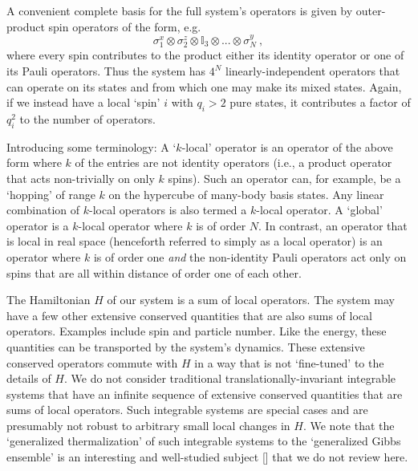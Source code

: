 \documentclass[amsmath,onecolumn, superscriptaddress,preprint,aps]{revtex4}
\renewcommand{\cite}[1]{[\onlinecite{#1}]}
\begin{document}
 A convenient complete basis for the full system's operators is given by outer-product spin operators of the form, e.g.
 \begin{equation}
 \sigma^x_1 \otimes \sigma^z_2 \otimes \mathbb{I}_3 \otimes...\otimes \sigma^y_N~,
 \end{equation}
 where every spin contributes to the product either its identity operator or one of its Pauli operators.
 Thus the system has $4^N$ linearly-independent operators that can operate on its states and from which one may make its mixed states.
 Again, if we instead have a local `spin' $i$ with $q_i>2$ pure states, it contributes a factor of $q_i^2$ to the number of operators.

Introducing some terminology:  A `$k$-local' operator is an operator of the above form where $k$ of the entries are not identity operators
(i.e., a product operator that acts non-trivially on only $k$ spins).  Such an operator can, for example, be a `hopping' of range $k$ on the hypercube of many-body basis states. Any linear combination of $k$-local operators is also termed a $k$-local operator.
A `global' operator is a $k$-local operator where $k$ is of order $N$.  In contrast, an operator that is local in real space
(henceforth referred to simply as a local operator) is an operator where $k$ is of order one {\it and} the non-identity Pauli operators act only
on spins that are all within distance of order one of each other.

The Hamiltonian $H$ of our system is a sum of local operators.  The system may have a few other extensive conserved quantities that are also sums of local operators.  Examples include spin and particle number.  Like the energy, these quantities can be transported by the system's dynamics.  These extensive conserved operators commute with $H$ in a way that is not `fine-tuned' to the details of $H$.  We do not consider traditional translationally-invariant integrable systems that have an infinite sequence of extensive conserved quantities that are sums of local operators.  Such integrable systems are special cases and are presumably not robust to arbitrary small local changes in $H$.  We note that the `generalized thermalization' of such integrable systems to the `generalized Gibbs ensemble' is an interesting and well-studied subject \cite{GGE0, GGE1, GGE2} that we do not review here.
\end{document}
